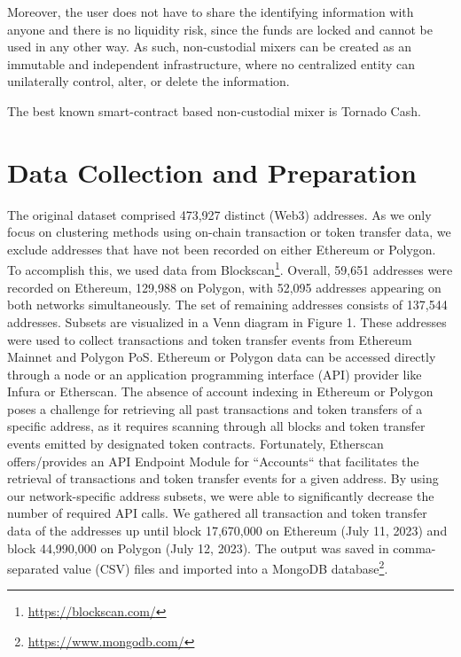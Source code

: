 \documentclass[12pt,a4paper,titlepage,oneside,english]{article}
\begin{document}
Moreover, the user does not have to share the identifying information with anyone and there is no liquidity risk, since the funds are locked and cannot be used in any other way. As such, non-custodial mixers can be created as an immutable and independent infrastructure, where no centralized entity can unilaterally control, alter, or delete the information.


The best known smart-contract based non-custodial mixer is Tornado Cash.



\section{Data Collection and Preparation}

The original dataset comprised 473,927 distinct (Web3) addresses. As we only focus on clustering methods using on-chain transaction or token transfer data, we exclude addresses that have not been recorded on either Ethereum or Polygon. To accomplish this, we used data from Blockscan\footnote{\url{https://blockscan.com/}}. Overall, 59,651 addresses were recorded on Ethereum, 129,988 on Polygon, with 52,095 addresses appearing on both networks simultaneously. The set of remaining addresses consists of 137,544 addresses. Subsets are visualized in a Venn diagram in Figure 1. 
These addresses were used to collect transactions and token transfer events from Ethereum Mainnet and Polygon PoS. Ethereum or Polygon data can be accessed directly through a node or an application programming interface (API) provider like Infura or Etherscan. The absence of account indexing in Ethereum or Polygon poses a challenge for retrieving all past transactions and token transfers of a specific address, as it requires scanning through all blocks and token transfer events emitted by designated token contracts. Fortunately, Etherscan offers/provides an API Endpoint Module for ``Accounts`` that facilitates the retrieval of transactions and token transfer events for a given address. By using our network-specific address subsets, we were able to significantly decrease the number of required API calls. 
We gathered all transaction and token transfer data of the addresses up until block 17,670,000 on Ethereum (July 11, 2023) and block 44,990,000 on Polygon (July 12, 2023). The output was saved in comma-separated value (CSV) files and imported into a MongoDB database\footnote{\url{https://www.mongodb.com/}}.
\end{document}
